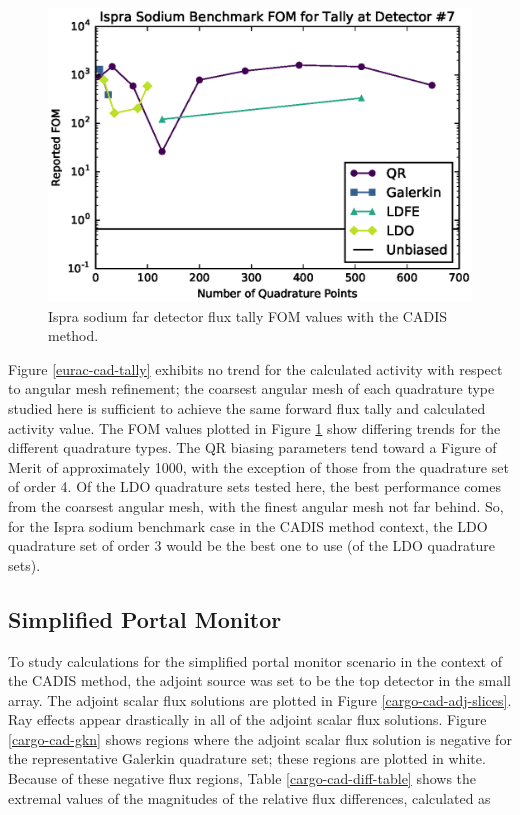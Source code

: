 \begin{figure}[!htb]
\centering
\includegraphics[max height=0.445\textheight]{img/eurac-plots/mcnp/cadis-fom-74.eps}
\caption{Ispra sodium far detector flux tally FOM values with the CADIS method.}
\label{eurac-cad-fom}
\end{figure}

Figure \ref{eurac-cad-tally} exhibits no trend for the calculated activity with
respect to angular mesh refinement; the coarsest angular mesh of each quadrature type
studied here is sufficient to achieve the same forward flux tally and calculated
activity value. The FOM values plotted in Figure \ref{eurac-cad-fom} show
differing trends for the different quadrature types. The QR biasing parameters tend
toward a Figure of Merit of approximately 1000, with the exception of those from the
quadrature set of order 4. Of the LDO quadrature sets tested here, the best
performance comes from the coarsest angular mesh, with the finest angular mesh not far
behind. So, for the Ispra sodium benchmark case in the CADIS method context, the LDO
quadrature set of order 3 would be the best one to use (of the LDO quadrature sets).

\FloatBarrier
\subsection{Simplified Portal Monitor}

To study calculations for the simplified portal monitor scenario in the context of the CADIS 
method, the adjoint source was set to be the top detector in the small array. The adjoint scalar
flux solutions are plotted in Figure \ref{cargo-cad-adj-slices}. Ray effects appear
drastically in all of the adjoint scalar flux solutions. Figure \ref{cargo-cad-gkn}
shows regions where the adjoint scalar flux solution is negative for the 
representative Galerkin quadrature set; these regions are plotted in white.
Because of these negative flux regions, Table \ref{cargo-cad-diff-table} shows the 
extremal values of the magnitudes of the relative flux differences, calculated as

